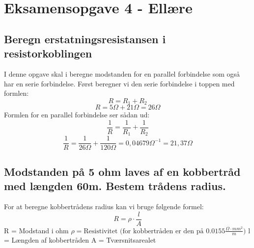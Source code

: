 \newpage
\section{Eksamensopgave 4 - Ellære}
\subsection{Beregn erstatningsresistansen i resistorkoblingen}
I denne opgave skal i beregne modstanden for en parallel forbindelse som også har en serie forbindelse.
Først beregner vi den serie forbindelse i toppen med formlen:
\begin{equation*}
    R=R_{1}+R_{2}
\end{equation*}
\begin{equation*}
    R=5\Omega+21\Omega=26\Omega
\end{equation*}
Formlen for en parallel forbindelse ser sådan ud:
\begin{equation*}
    \frac{1}{R}=\frac{1}{R_{1}}+\frac{1}{R_{2}}
\end{equation*}
\begin{equation*}
    \frac{1}{R}=\frac{1}{26\Omega}+\frac{1}{120\Omega}=0,04679\Omega^{-1}=21,37\Omega
\end{equation*}

\subsection{Modstanden på 5 ohm laves af en kobbertråd med længden 60m. Bestem trådens radius.}
For at beregne kobbertrådens radius kan vi bruge følgende formel:
\begin{equation*}
    R=\rho\cdot\frac{l}{A}
\end{equation*}
R = Modstand i ohm\newline
\begin{math}
    \rho = \text{Resistivitet (for kobbertråden er den på } 0.0155 \frac{\Omega \cdot mm^{2}}{m})
\end{math}\newline
l = Længden af kobbertråden\newline
A = Tværsnitsarealet\newline

